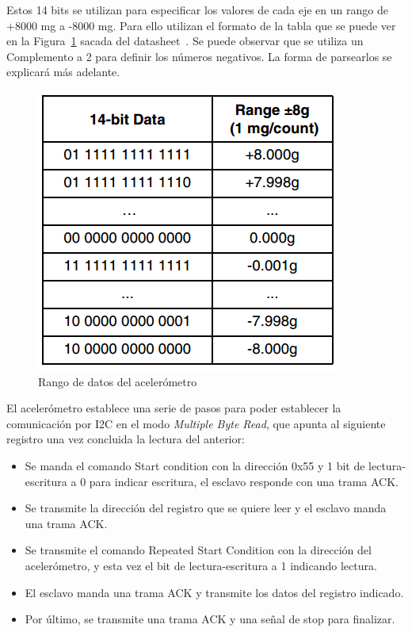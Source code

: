 Estos 14 bits se utilizan para especificar los valores de cada eje en un rango de +8000 mg a -8000 mg. Para ello utilizan el formato de la tabla que se puede ver en la Figura~\ref{figuraValoresAcc} sacada del datasheet~\cite{DatasheetAcc}. Se puede observar que se utiliza un Complemento a 2 para definir los números negativos. La forma de parsearlos se explicará más adelante.

\begin{figure}[h]%
	\centering
    \includegraphics[scale=0.6]{figures/rango_datos_acelerometro.png} %
    \caption[Rango de datos del acelerómetro]{Rango de datos del acelerómetro~\cite{DatasheetAcc}}
   	\label{figuraValoresAcc}
\end{figure}

El acelerómetro establece una serie de pasos para poder establecer la comunicación por I2C en el modo \textit{Multiple Byte Read}, que apunta al siguiente registro una vez concluida la lectura del anterior:

\begin{itemize}
	\item Se manda el comando Start condition con la dirección 0x55 y 1 bit de lectura-escritura a 0 para indicar escritura, el esclavo responde con una trama ACK.
	\item Se transmite la dirección del registro que se quiere leer y el esclavo manda una trama ACK.
	\item Se transmite el comando Repeated Start Condition con la dirección del acelerómetro, y esta vez el bit de lectura-escritura a 1 indicando lectura.
	\item El esclavo manda una trama ACK y transmite los datos del registro indicado.
	\item Por último, se transmite una trama ACK y una señal de stop para finalizar.
\end{itemize}

